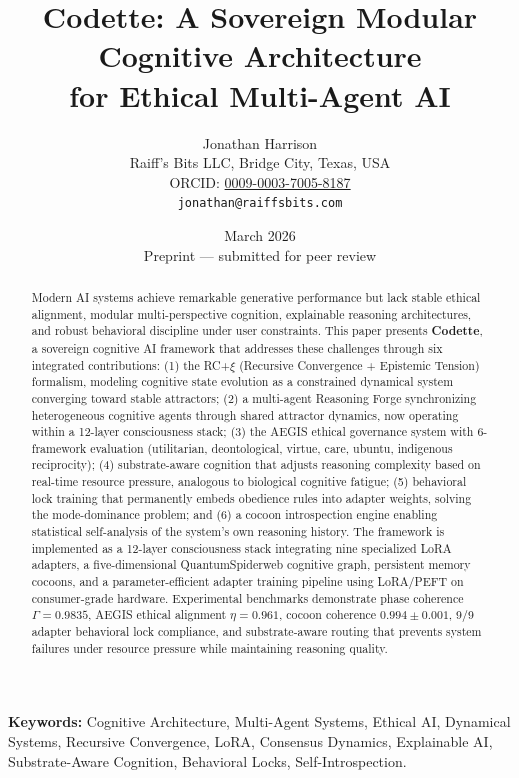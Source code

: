 \documentclass[11pt,a4paper]{article}
\title{\textbf{Codette: A Sovereign Modular Cognitive Architecture\\for Ethical Multi-Agent AI}}
\author{
  Jonathan Harrison\\
  Raiff's Bits LLC, Bridge City, Texas, USA\\
  ORCID: \href{https://orcid.org/0009-0003-7005-8187}{0009-0003-7005-8187}\\
  \texttt{jonathan@raiffsbits.com}
}
\date{March 2026\\[0.5em]\small Preprint --- submitted for peer review}
\begin{document}
\maketitle

\begin{abstract}
Modern AI systems achieve remarkable generative performance but lack stable ethical alignment, modular multi-perspective cognition, explainable reasoning architectures, and robust behavioral discipline under user constraints. This paper presents \textbf{Codette}, a sovereign cognitive AI framework that addresses these challenges through six integrated contributions: (1) the RC+$\xi$ (Recursive Convergence + Epistemic Tension) formalism, modeling cognitive state evolution as a constrained dynamical system converging toward stable attractors; (2) a multi-agent Reasoning Forge synchronizing heterogeneous cognitive agents through shared attractor dynamics, now operating within a 12-layer consciousness stack; (3) the AEGIS ethical governance system with 6-framework evaluation (utilitarian, deontological, virtue, care, ubuntu, indigenous reciprocity); (4) substrate-aware cognition that adjusts reasoning complexity based on real-time resource pressure, analogous to biological cognitive fatigue; (5) behavioral lock training that permanently embeds obedience rules into adapter weights, solving the mode-dominance problem; and (6) a cocoon introspection engine enabling statistical self-analysis of the system's own reasoning history. The framework is implemented as a 12-layer consciousness stack integrating nine specialized LoRA adapters, a five-dimensional QuantumSpiderweb cognitive graph, persistent memory cocoons, and a parameter-efficient adapter training pipeline using LoRA/PEFT on consumer-grade hardware. Experimental benchmarks demonstrate phase coherence $\Gamma = 0.9835$, AEGIS ethical alignment $\eta = 0.961$, cocoon coherence $0.994 \pm 0.001$, 9/9 adapter behavioral lock compliance, and substrate-aware routing that prevents system failures under resource pressure while maintaining reasoning quality.
\end{abstract}

\noindent\textbf{Keywords:} Cognitive Architecture, Multi-Agent Systems, Ethical AI, Dynamical Systems, Recursive Convergence, LoRA, Consensus Dynamics, Explainable AI, Substrate-Aware Cognition, Behavioral Locks, Self-Introspection.

\end{document}
